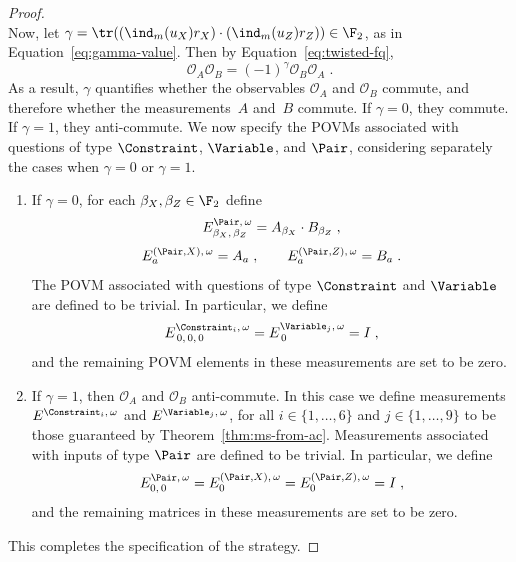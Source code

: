 \begin{proof}
\begin{equation*}
  \end{equation*}
  Now, let $\gamma = \tr((\ind_{m}(u_X)r_X) \cdot (\ind_{m}(u_Z)r_Z)) \in \F_2$,
  as in Equation~\eqref{eq:gamma-value}.
  Then by Equation~\eqref{eq:twisted-fq},
  \begin{equation*}
  \mathcal{O}_A \mathcal{O}_B = (-1)^{\gamma} \mathcal{O}_B \mathcal{O}_A\;.
  \end{equation*}
  As a result, $\gamma$ quantifies whether the observables $\mathcal{O}_A$ and
  $\mathcal{O}_B$ commute, and therefore whether the measurements~$A$ and~$B$
  commute.
  If $\gamma = 0$, they commute.
  If $\gamma = 1$, they anti-commute.
  We now specify the POVMs associated with questions of type $\Constraint$,
  $\Variable$, and $\Pair$, considering separately the cases when $\gamma = 0$
  or $\gamma = 1$.
  \begin{enumerate}
  \item If $\gamma = 0$, 
     for each $\beta_X, \beta_Z \in \F_2$ define
    \begin{equation}\label{eq:pair-definition}
      E^{\Pair,\, \omega}_{\beta_X,\, \beta_Z} = A_{\beta_X} \cdot B_{\beta_Z}\;,
    \end{equation}
    \begin{equation*}
      E^{(\Pair,X),\, \omega}_{a} = A_{a} \;,\qquad
      E^{(\Pair,Z),\, \omega}_{a} = B_{a}\;.
    \end{equation*}
    The POVM associated with questions of type $\Constraint$ and $\Variable$ are
    defined to be trivial.
    In particular, we define
    \begin{equation*}
      E^{\Constraint_i,\, \omega}_{\, 0,\, 0,\, 0}
      = E^{\Variable_j,\, \omega}_{\, 0} = I\;,
    \end{equation*}
    and the remaining POVM elements in these measurements are set to be zero.
  \item If $\gamma = 1$, then $\mathcal{O}_A$ and $\mathcal{O}_B$ anti-commute.
    In this case we define measurements $E^{\Constraint_i,\, \omega}$ and
    $E^{\Variable_j,\, \omega}$, for all $i\in\{1,\ldots,6\}$ and $j
    \in\{1,\ldots,9\}$ to be those guaranteed by Theorem~\ref{thm:ms-from-ac}.
    Measurements associated with inputs of type $\Pair$ are defined to be
    trivial.
    In particular, we define
    \begin{equation*}
      E^{\Pair,\, \omega}_{0,\, 0} = E^{(\Pair,X),\, \omega}_{0} = E^{(\Pair,Z),\, \omega}_{0} = I\;,
    \end{equation*}
    and the remaining matrices in these measurements are set to be zero.
  \end{enumerate}
  This completes the specification of the strategy.


\end{proof}
